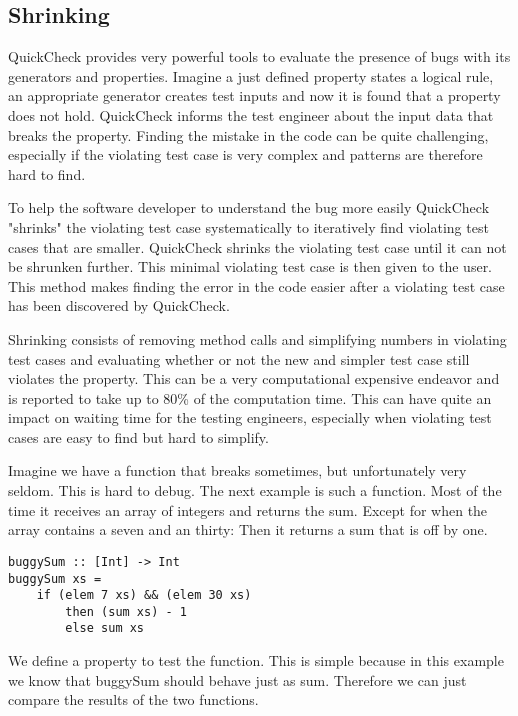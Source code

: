 \documentclass[a4paper, 12pt]{article} %
\begin{document}
\subsection{Shrinking}

QuickCheck provides very powerful tools to evaluate the presence of bugs with its generators and properties. Imagine a just defined property states a logical rule, an appropriate generator creates test inputs and now it is found that a property does not hold. QuickCheck informs the test engineer about the input data that breaks the property. Finding the mistake in the code can be quite challenging, especially if the violating test case is very complex and patterns are therefore hard to find. 

To help the software developer to understand the bug more easily QuickCheck "shrinks" the violating test case systematically to iteratively find violating test cases that are smaller. QuickCheck shrinks the violating test case until it can not be shrunken further. This minimal violating test case is then given to the user. This method makes finding the error in the code easier after a violating test case has been discovered by QuickCheck\cite{Claessen2009}.

Shrinking consists of removing method calls and simplifying numbers in violating test cases and evaluating whether or not the new and simpler test case still violates the property. This can be a very computational expensive endeavor and is reported to take up to 80\% of the computation time. This can have quite an impact on waiting time for the testing engineers, especially when violating test cases are easy to find but hard to simplify\cite{Hughes:2016}.

Imagine we have a function that breaks sometimes, but unfortunately very seldom. This is hard to debug. The next example is such a function. Most of the time it receives an array of integers and returns the sum. Except for when the array contains a seven and an thirty: Then it returns a sum that is off by one.

\begin{verbatim}
buggySum :: [Int] -> Int
buggySum xs = 
    if (elem 7 xs) && (elem 30 xs)
        then (sum xs) - 1
        else sum xs
\end{verbatim}

We define a property to test the function. This is simple because in this example we know that buggySum should behave just as sum. Therefore we can just compare the results of the two functions.
\end{document}
